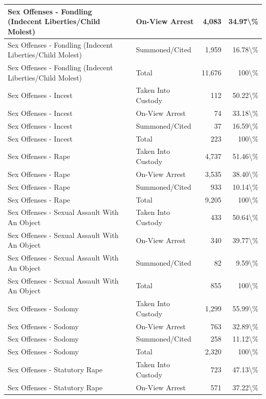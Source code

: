 \documentclass[
]{krantz}
\begin{document}
\begin{longtable}[t]{l|l|r|r}
\hline
Sex Offenses - Fondling (Indecent Liberties/Child Molest) & On-View Arrest & 4,083 & 34.97\textbackslash{}\%\\
\hline
Sex Offenses - Fondling (Indecent Liberties/Child Molest) & Summoned/Cited & 1,959 & 16.78\textbackslash{}\%\\
\hline
Sex Offenses - Fondling (Indecent Liberties/Child Molest) & Total & 11,676 & 100\textbackslash{}\%\\
\hline
Sex Offenses - Incest & Taken Into Custody & 112 & 50.22\textbackslash{}\%\\
\hline
Sex Offenses - Incest & On-View Arrest & 74 & 33.18\textbackslash{}\%\\
\hline
Sex Offenses - Incest & Summoned/Cited & 37 & 16.59\textbackslash{}\%\\
\hline
Sex Offenses - Incest & Total & 223 & 100\textbackslash{}\%\\
\hline
Sex Offenses - Rape & Taken Into Custody & 4,737 & 51.46\textbackslash{}\%\\
\hline
Sex Offenses - Rape & On-View Arrest & 3,535 & 38.40\textbackslash{}\%\\
\hline
Sex Offenses - Rape & Summoned/Cited & 933 & 10.14\textbackslash{}\%\\
\hline
Sex Offenses - Rape & Total & 9,205 & 100\textbackslash{}\%\\
\hline
Sex Offenses - Sexual Assault With An Object & Taken Into Custody & 433 & 50.64\textbackslash{}\%\\
\hline
Sex Offenses - Sexual Assault With An Object & On-View Arrest & 340 & 39.77\textbackslash{}\%\\
\hline
Sex Offenses - Sexual Assault With An Object & Summoned/Cited & 82 & 9.59\textbackslash{}\%\\
\hline
Sex Offenses - Sexual Assault With An Object & Total & 855 & 100\textbackslash{}\%\\
\hline
Sex Offenses - Sodomy & Taken Into Custody & 1,299 & 55.99\textbackslash{}\%\\
\hline
Sex Offenses - Sodomy & On-View Arrest & 763 & 32.89\textbackslash{}\%\\
\hline
Sex Offenses - Sodomy & Summoned/Cited & 258 & 11.12\textbackslash{}\%\\
\hline
Sex Offenses - Sodomy & Total & 2,320 & 100\textbackslash{}\%\\
\hline
Sex Offenses - Statutory Rape & Taken Into Custody & 723 & 47.13\textbackslash{}\%\\
\hline
Sex Offenses - Statutory Rape & On-View Arrest & 571 & 37.22\textbackslash{}\%\\

\end{longtable}
\end{document}
